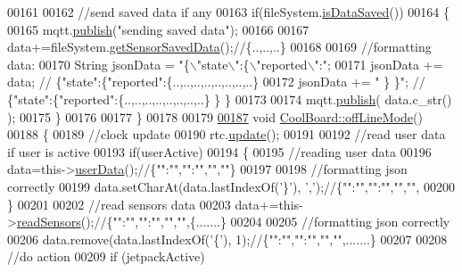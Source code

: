 \begin{DoxyCode}
00161     
00162     \textcolor{comment}{//send saved data if any}
00163     \textcolor{keywordflow}{if}(fileSystem.\hyperlink{class_cool_file_system_a5a7eaeea7a9fbf8aaef651d862fa3b5b}{isDataSaved}())
00164     \{
00165         mqtt.\hyperlink{class_cool_m_q_t_t_ace977b3e90ab14b1199fe5c4fb0a13ec}{publish}(\textcolor{stringliteral}{"sending saved data"});
00166         
00167         data+=fileSystem.\hyperlink{class_cool_file_system_a5c58bca3735c0ed3efb268d70ef998ef}{getSensorSavedData}();\textcolor{comment}{//\{..,..,..\}}
00168 
00169         \textcolor{comment}{//formatting data:}
00170         String jsonData = \textcolor{stringliteral}{"\{\(\backslash\)"state\(\backslash\)":\{\(\backslash\)"reported\(\backslash\)":"};
00171         jsonData += data; \textcolor{comment}{// \{"state":\{"reported":\{..,..,..,..,..,..,..,..\}}
00172         jsonData += \textcolor{stringliteral}{" \} \}"}; \textcolor{comment}{// \{"state":\{"reported":\{..,..,..,..,..,..,..,..\}  \} \}}
00173 
00174         mqtt.\hyperlink{class_cool_m_q_t_t_ace977b3e90ab14b1199fe5c4fb0a13ec}{publish}( data.c\_str() );
00175     \}
00176         
00177 \}
00178 
00179 
\hyperlink{class_cool_board_ae6b5e1274d760462290192acea4adca8}{00187} \textcolor{keywordtype}{void} \hyperlink{class_cool_board_ae6b5e1274d760462290192acea4adca8}{CoolBoard::offLineMode}()
00188 \{
00189     \textcolor{comment}{//clock update}
00190     rtc.\hyperlink{class_cool_time_aae601f795452cfa48d9fb337aed483a8}{update}();
00191     
00192     \textcolor{comment}{//read user data if user is active}
00193     \textcolor{keywordflow}{if}(userActive)
00194     \{
00195         \textcolor{comment}{//reading user data}
00196         data=this->\hyperlink{class_cool_board_ae7358fb6e623cfc81b775f5f1734909b}{userData}();\textcolor{comment}{//\{"":"","":"","",""\}}
00197         
00198         \textcolor{comment}{//formatting json correctly}
00199         data.setCharAt(data.lastIndexOf(\textcolor{charliteral}{'\}'}), \textcolor{charliteral}{','});\textcolor{comment}{//\{"":"","":"","","",}
00200     \}   
00201     
00202     \textcolor{comment}{//read sensors data}
00203     data+=this->\hyperlink{class_cool_board_ad03abdce2e65f520bbf2cff0f2d083cf}{readSensors}();\textcolor{comment}{//\{"":"","":"","","",\{.......\}}
00204     
00205     \textcolor{comment}{//formatting json correctly}
00206     data.remove(data.lastIndexOf(\textcolor{charliteral}{'\{'}), 1);\textcolor{comment}{//\{"":"","":"","","",.......\}}
00207 
00208     \textcolor{comment}{//do action}
00209     \textcolor{keywordflow}{if} (jetpackActive)

\end{DoxyCode}
